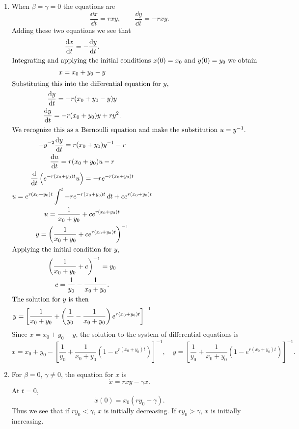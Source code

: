 \begin{Solution}
  \begin{enumerate}
  \item 
    When $\beta = \gamma = 0$ the equations are
    \[ \frac{\dd x}{\dd t} = r x y, \qquad \frac{\dd y}{\dd t} = - r x y. \]
    Adding these two equations we see that
    \begin{gather*}
      \frac{\mathrm{d} x}{\mathrm{d} t} = - \frac{\mathrm{d} y}{\mathrm{d} t}. \\
      \intertext{Integrating and applying the initial conditions $x(0)=x_0$ and
        $y(0)=y_0$ we obtain}
      x = x_0 + y_0 - y \\
      \intertext{Substituting this into the differential equation for $y$,}
      \frac{\mathrm{d} y}{\mathrm{d} t} = -r (x_0 + y_0 - y) y \\
      \frac{\mathrm{d} y}{\mathrm{d} t} = -r (x_0 + y_0) y + r y^2. \\
      \intertext{We recognize this as a Bernoulli equation and make the substitution
        $u = y^{-1}$.}
      - y^{-2} \frac{\mathrm{d} y}{\mathrm{d} t} = r (x_0 + y_0) y^{-1} - r \\
      \frac{\mathrm{d} u}{\mathrm{d} t} = r (x_0 + y_0) u - r \\
      \frac{\mathrm{d}}{\mathrm{d} t} \left( e^{-r(x_0+y_0) t} u \right) = -r e^{-r(x_0+y_0)t} \\
      u = e^{r(x_0+y_0)t} \int^t -r e^{-r(x_0+y_0)t}\,d t
      + c e^{r(x_0+y_0)t} \\
      u = \frac{1}{x_0+y_0} + c e^{r(x_0+y_0)t} \\
      y = \left(\frac{1}{x_0+y_0} + c e^{r(x_0+y_0)t} \right)^{-1} \\
      \intertext{Applying the initial condition for $y$,}
      \left( \frac{1}{x_0+y_0} + c \right)^{-1} = y_0 \\
      c = \frac{1}{y_0} - \frac{1}{x_0+y_0}. \\
      \intertext{The solution for $y$ is then}
      y = \left[ \frac{1}{x_0+y_0} + \left( \frac{1}{y_0} - \frac{1}{x_0+y_0} \right)
        e^{r(x_0+y_0)t} \right]^{-1}
    \end{gather*}
    Since $x = x_0 + y_0 - y$, the solution to the system of differential 
    equations is
    \[ \boxed{ x = x_0 + y_0 - \left[ \frac{1}{y_0} + \frac{1}{x_0+y_0}
        \left(1 - e^{r(x_0+y_0)t} \right) \right]^{-1}, \quad
      y = \left[ \frac{1}{y_0} + \frac{1}{x_0+y_0} \left(1 - 
          e^{r(x_0+y_0)t} \right) \right]^{-1}. } \]
  \item
    For $\beta = 0$, $\gamma \neq 0$, the equation for $x$ is
    \[ \dot{x} = r x y - \gamma x. \]
    At $t = 0$, 
    \[ \dot{x}(0) = x_0 (r y_0 - \gamma). \]
    Thus we see that if $ry_0 < \gamma$, $x$ is initially decreasing.
    If $r y_0 > \gamma$, $x$ is initially increasing.






\end{enumerate}
\end{Solution}
